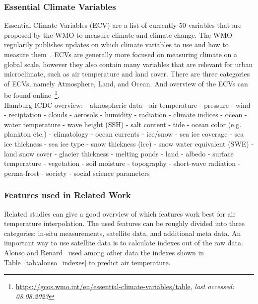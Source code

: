 \subsubsection{Essential Climate Variables}

Essential Climate Variables (ECV) are a list of currently 50 variables that are proposed by the WMO to measure climate and climate change. The WMO regularily publishes updates on which climate variables to use and how to measure them~\cite{wmo2018guide}. ECVs are generally more focused on measuring climate on a global scale, however they also contain many variables that are relevant for urban microclimate, such as air temperature and land cover. There are three categories of ECVs, namely Atmosphere, Land, and Ocean. And overview of the ECVs can be found online~\footnote{\url{https://gcos.wmo.int/en/essential-climate-variables/table}, \textit{last accessed: 08.08.2023}}.\\

Hamburg ICDC overview:
- atmospheric data
    - air temperature
    - pressure
    - wind
    - reciptation
    - clouds
    - aerosols
    - humidity
    - radiation
    - climate indices
- ocean
    - water temperature
    - wave height (SSH)
    - salt content
    - tide
    - ocean color (e.g. plankton etc.)
    - climatology
    - ocean currents
- ice/snow
    - sea ice coverage
    - sea ice thickness
    - sea ice type
    - snow thickness (ice)
    - snow water equivalent (SWE)
    - land snow cover
    - glacier thickness
    - melting ponds
- land
    - albedo
    - surface temperature
    - vegetation
    - soil moisture
    - topography
    - short-wave radiation
    - perma-frost
- society
    - social science parameters

\subsubsection{Features used in Related Work}

Related studies can give a good overview of which features work best for air temperature interpolation. The used features can be roughly divided into three categories: in-situ measurements, satellite data, and additional meta data.
An important way to use satellite data is to calculate indexes out of the raw data. Alonso and Renard~\cite{alonso2020new} used among other data the indexes shown in Table~\ref{tab:alonso_indexes} to predict air temperature.

